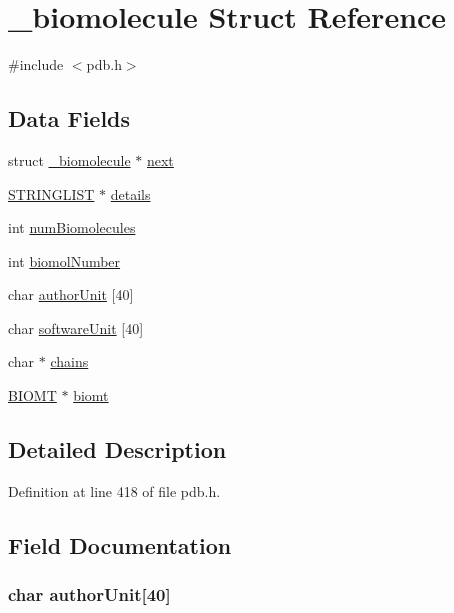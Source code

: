\hypertarget{struct__biomolecule}{\section{\-\_\-biomolecule Struct Reference}
\label{struct__biomolecule}
}


{\ttfamily \#include $<$pdb.\-h$>$}

\subsection*{Data Fields}
\begin{DoxyCompactItemize}
\item 
struct \hyperlink{struct__biomolecule}{\-\_\-biomolecule} $\ast$ \hyperlink{struct__biomolecule_aa5cc2750e98897a372b0e8a16d5f39f2}{next}
\item 
\hyperlink{general_8h_a9689e1c779b5f538d971aa687c441210}{S\-T\-R\-I\-N\-G\-L\-I\-S\-T} $\ast$ \hyperlink{struct__biomolecule_a73debaf9b15b1bb04d12377b5c36a9ed}{details}
\item 
int \hyperlink{struct__biomolecule_af852d0d5d1cbc23cc11727f06a626c13}{num\-Biomolecules}
\item 
int \hyperlink{struct__biomolecule_a84838cab5fc375053ed4a09a5b4f8cec}{biomol\-Number}
\item 
char \hyperlink{struct__biomolecule_a8781f7215f7cba70df6f0b410f13a13a}{author\-Unit} \mbox{[}40\mbox{]}
\item 
char \hyperlink{struct__biomolecule_a40fac6adaa0a0daef077b77e041a3ba8}{software\-Unit} \mbox{[}40\mbox{]}
\item 
char $\ast$ \hyperlink{struct__biomolecule_a3a6f716388528a6d28884736306c5c23}{chains}
\item 
\hyperlink{pdb_8h_a9d0e33b604b43ad804fa9820c43c9d35}{B\-I\-O\-M\-T} $\ast$ \hyperlink{struct__biomolecule_ac6a46f6182ce9d01b06d36ece7d5cb0f}{biomt}
\end{DoxyCompactItemize}


\subsection{Detailed Description}


Definition at line 418 of file pdb.\-h.



\subsection{Field Documentation}
\hypertarget{struct__biomolecule_a8781f7215f7cba70df6f0b410f13a13a}{
\subsubsection[{author\-Unit}]{\setlength{\rightskip}{0pt plus 5cm}char author\-Unit\mbox{[}40\mbox{]}}}\label{struct__biomolecule_a8781f7215f7cba70df6f0b410f13a13a}


